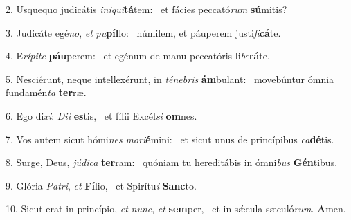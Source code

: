 2. Usquequo judicátis \textit{in}\textit{i}\textit{qui}\textbf{tá}tem: \ast\  et fácies peccató\textit{rum} \textbf{sú}mitis?\

3. Judicáte egé\textit{no}, \textit{et} \textit{pu}\textbf{píl}lo: \ast\  húmilem, et páuperem justi\textit{fi}\textbf{cá}te.\

4. E\textit{rí}\textit{pi}\textit{te} \textbf{páu}perem: \ast\  et egénum de manu peccatóris li\textit{be}\textbf{rá}te.\

5. Nesciérunt, neque intellexérunt, in \textit{té}\textit{ne}\textit{bris} \textbf{ám}bulant: \ast\  movebúntur ómnia fundamén\textit{ta} \textbf{ter}ræ.\

6. Ego di\textit{xi}: \textit{Di}\textit{i} \textbf{es}tis, \ast\  et fílii Excél\textit{si} \textbf{om}nes.\

7. Vos autem sicut hómi\textit{nes} \textit{mo}\textit{ri}\textbf{é}mini: \ast\  et sicut unus de princípibus \textit{ca}\textbf{dé}tis.\

8. Surge, Deus, \textit{jú}\textit{di}\textit{ca} \textbf{ter}ram: \ast\  quóniam tu hereditábis in ómni\textit{bus} \textbf{Gén}tibus.\

9. Glória \textit{Pa}\textit{tri}, \textit{et} \textbf{Fí}lio, \ast\  et Spirítu\textit{i} \textbf{Sanc}to.\

10. Sicut erat in princípio, \textit{et} \textit{nunc}, \textit{et} \textbf{sem}per, \ast\  et in sǽcula sæculó\textit{rum}. \textbf{A}men.\


